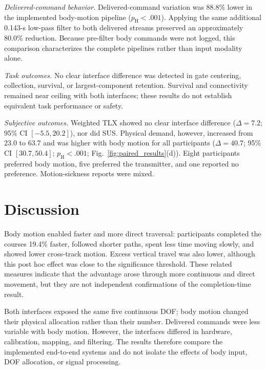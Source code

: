\emph{Delivered-command behavior.}
Delivered-command variation was 88.8\% lower in the implemented body-motion
pipeline ($p_{\mathrm H}<.001$). Applying the same additional 0.143-s
low-pass filter to both delivered streams preserved an approximately 80.0\%
reduction. Because pre-filter body commands were not logged, this comparison
characterizes the complete pipelines rather than input modality alone.

\emph{Task outcomes.}
No clear interface difference was detected in gate centering, collection,
survival, or largest-component retention. Survival and connectivity remained
near ceiling with both interfaces; these results do not establish equivalent
task performance or safety.

\emph{Subjective outcomes.}
Weighted TLX showed no clear interface difference ($\Delta=7.2$; 95\% CI
$[-5.5,20.2]$), nor did SUS. Physical demand, however, increased from 23.0
to 63.7 and was higher with body motion for all participants
($\Delta=40.7$; 95\% CI $[30.7,50.4]$;
$p_{\mathrm H}<.001$; Fig.~\ref{fig:paired_results}(d)). Eight participants
preferred body motion, five preferred the transmitter, and one reported no
preference. Motion-sickness reports were mixed.

\FloatBarrier

\section{Discussion}

Body motion enabled faster and more direct traversal: participants completed
the courses 19.4\% faster, followed shorter paths, spent less time moving
slowly, and showed lower cross-track motion. Excess vertical travel was also
lower, although this post hoc effect was close to the significance threshold.
These related measures indicate that the advantage arose through more
continuous and direct movement, but they are not independent confirmations of
the completion-time result.

Both interfaces exposed the same five continuous DOF; body motion changed
their physical allocation rather than their number. Delivered commands were less variable with body motion. However, the interfaces
differed in hardware, calibration, mapping, and filtering. The results therefore compare
the implemented end-to-end systems and do not isolate the effects of body input,
DOF allocation, or signal processing.

